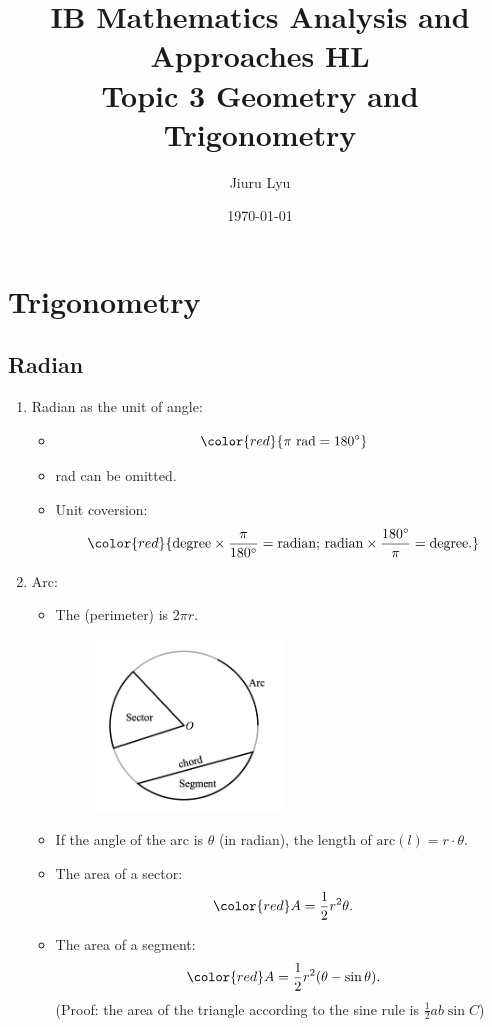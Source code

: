 \documentclass[12pt, a4paper]{article}
\title{\textbf{IB Mathematics Analysis and Approaches HL}\\
Topic 3 Geometry and Trigonometry}
\author{Jiuru Lyu}
\date{\today}
\begin{document}
\maketitle
\tableofcontents

\newpage

\section{Trigonometry}
\subsection{Radian}
\begin{enumerate}
  \item Radian as the unit of angle: 
  \begin{itemize}
    \item $${\color{red}{\pi\ \text{rad}=180^\circ}}$$
    \item rad can be omitted. {}
    \item Unit coversion: $${\color{red}{\text{degree}\times\frac{\pi}{180^\circ}=\text{radian;\ radian}\times\frac{180^\circ}{\pi}=\text{degree}.}}$$
  \end{itemize}
  \item Arc: 
  \begin{itemize}
    \item The \textbf{\color{red}{circumference}} (perimeter) is $2\pi r$.
    \begin{figure}[H]
      \centering
      \includegraphics[width=0.5\textwidth]{Fig.18.jpg}
    \end{figure}
    \item If the angle of the arc is $\theta$ (in radian), the length of $\text{arc}(l)=r\cdot\theta$.
    \item The area of a sector: $$\color{red}A=\frac{1}{2}r^2\theta.$$
    \item The area of a segment: $$\color{red}A=\frac{1}{2}r^2(\theta-\sin\theta).$$(Proof: the area of the triangle according to the sine rule is $\frac{1}{2}ab\sin C$)
  \end{itemize}
\end{enumerate}
\end{document}
